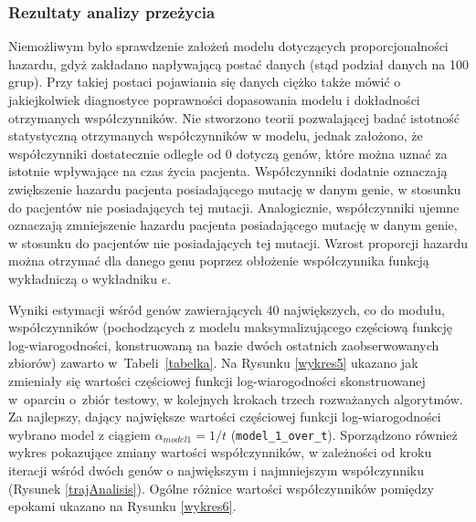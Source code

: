 \subsubsection{Rezultaty analizy przeżycia}

Niemożliwym było sprawdzenie założeń modelu dotyczących proporcjonalności
hazardu, gdyż zakładano napływającą postać danych (stąd podział danych
na 100 grup). Przy takiej postaci pojawiania się danych ciężko także
mówić o jakiejkolwiek diagnostyce poprawności dopasowania modelu i
dokładności otrzymanych współczynników. Nie stworzono teorii
pozwalającej badać istotność statystyczną otrzymanych współczynników w
modelu, jednak założono, że współczynniki dostatecznie odległe od $0$ dotyczą genów, które
można uznać za istotnie wpływające na czas życia pacjenta. Współczynniki
dodatnie oznaczają zwiększenie hazardu pacjenta posiadającego mutację w
danym genie, w stosunku do pacjentów nie posiadających tej mutacji. Analogicznie, współczynniki ujemne oznaczają zmniejszenie hazardu pacjenta
posiadającego mutację w danym genie, w stosunku do pacjentów nie
posiadających tej mutacji. Wzrost proporcji hazardu można
otrzymać dla danego genu poprzez obłożenie współczynnika funkcją
wykładniczą o wykładniku $e$.


Wyniki estymacji wśród genów zawierających 40 największych, co do modułu,
współczynników (pochodzących z modelu maksymalizującego częściową funkcję log-wiarogodności, konstruowaną na bazie dwóch ostatnich zaobserwowanych zbiorów) zawarto w~Tabeli~\ref{tabelka}.
Na Rysunku \ref{wykres5} ukazano jak zmieniały się wartości częściowej funkcji log-wiarogodności skonstruowanej w~oparciu o~zbiór testowy, w kolejnych krokach trzech rozważanych algorytmów. Za najlepszy, dający największe wartości częściowej funkcji log-wiarogodności wybrano model z ciągiem $\alpha_{model1} = 1/t$ (\texttt{model\_1\_over\_t}). Sporządzono również wykres pokazujące zmiany wartości współczynników, w zależności od kroku iteracji wśród dwóch genów o największym i najmniejszym współczynniku (Rysunek \ref{trajAnalisis}). Ogólne różnice wartości współczynników pomiędzy epokami ukazano na Rysunku \ref{wykres6}.







